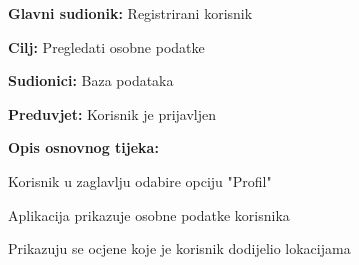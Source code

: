 				\noindent {}
					\begin{packed_item}
	
						\item \textbf{Glavni sudionik: } Registrirani korisnik
						\item  \textbf{Cilj:} Pregledati osobne podatke
						\item  \textbf{Sudionici:} Baza podataka
						\item  \textbf{Preduvjet:} Korisnik je prijavljen
						\item  \textbf{Opis osnovnog tijeka:}
						
						\item[] \begin{packed_enum}
	
							\item Korisnik u zaglavlju odabire opciju "Profil"
							\item Aplikacija prikazuje osobne podatke korisnika
							\item Prikazuju se ocjene koje je korisnik dodijelio lokacijama
							
						\end{packed_enum}
					\end{packed_item}
				
